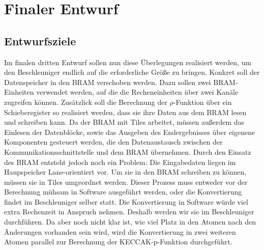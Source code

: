 \section{Finaler Entwurf}
\subsection{Entwurfsziele}
Im finalen dritten Entwurf sollen nun diese Überlegungen realisiert werden, um den Beschleuniger endlich auf die erforderliche Größe
zu bringen. Konkret soll der Datenspeicher in den BRAM verschoben werden. Dazu sollen zwei BRAM-Einheiten verwendet werden, auf die
die Recheneinheiten über zwei Kanäle zugreifen können. Zusätzlick soll die Berechnung der $\rho$-Funktion über ein Schieberegister so realisiert werden,
dass sie ihre Daten aus dem BRAM lesen und schreiben kann. Da der BRAM mit Tiles arbeitet, müssen außerdem das Einlesen der Datenblöcke,
sowie das Ausgeben des Endergebnisses über eigenene Komponenten gesteuert werden, die den Datenaustausch zwischen der Kommunikationsschnittstelle
und dem BRAM übernehmen. Durch den Einsatz des BRAM entsteht jedoch noch ein Problem: Die Eingabedaten liegen im Haupspeicher Lane-orientiert vor.
Um sie in den BRAM schreiben zu können, müssen sie in Tiles umgeordnet werden. Dieser Prozess muss entweder vor der Berechnung mühsam in Software
ausgeführt werden, oder die Konvertierung findet im Beschleuniger selber statt. Die Konvertierung in Software würde viel extra Rechenzeit in Anspruch
nehmen. Deshalb werden wir sie im Beschleuniger durchführen. Da aber noch nicht klar ist, wie viel Platz in den Atomen nach den Änderungen vorhanden sein wird,
wird die Konvertierung in zwei weiteren Atomen parallel zur Berechnung der KECCAK-p-Funktion durchgeführt.

